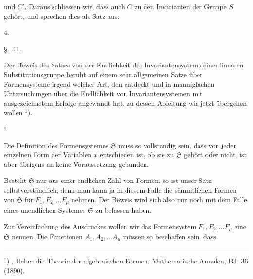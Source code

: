 und $C'$. Daraus schliessen wir, dass auch $C$ zu den Invarianten
der Gruppe $S$ gehört, und sprechen dies als Satz aus:

4. 

\begin{center}
\S.\ 41.

\end{center}

Der Beweis des Satzes von der Endlichkeit des Invariantensystems
 einer linearen Substitutionsgruppe beruht auf einem sehr
allgemeinen Satze über Formensysteme irgend welcher Art, den
 entdeckt und in mannigfachen Untersuchungen über
die Endlichkeit von Invariantensystemen mit ausgezeichnetem
Erfolge angewandt hat, zu dessen Ableitung wir jetzt übergehen
wollen $^{1}$).

I. 

Die Definition des Formensystemes $\mathfrak{S}$ muss so vollst\"andig
sein, dass von jeder einzelnen Form der Variablen $x$ entschieden
ist, ob sie zu $\mathfrak{S}$ gehört oder nicht, ist aber übrigens an keine
Voraussetzung gebunden.

Besteht $\mathfrak{S}$ nur aus einer endlichen Zahl von Formen, so ist
unser Satz selbstverst\"andlich, denn man kann ja in diesem Falle
die s\"ammtlichen Formen von $\mathfrak{S}$ f\"ur $F_1,F_2,\ldots F_\mu$ nehmen. Der
Beweis wird sich also nur noch mit dem Falle eines unendlichen
Systemes $\mathfrak{S}$ zu befassen haben.

Zur Vereinfachung des Ausdruckes wollen wir das Formensystem
 $F_1,F_2,\ldots F_\mu$ eine  $\mathfrak{S}$ nennen.
Die Functionen $A_1,A_2,\ldots A_\mu$ müssen so beschaffen sein, dass

\bigskip
\noindent\rule{4cm}{0.4pt}

\noindent $^{1}$) , \glqq Ueber die Theorie der algebraischen Formen\grqq{}. Mathematische
 Annalen, Bd. 36 (1890).
